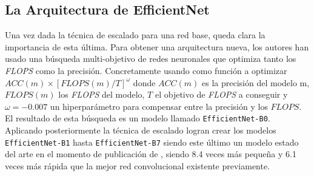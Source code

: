 \subsection{La Arquitectura de EfficientNet}
Una vez dada la técnica de escalado para una red base, queda clara la importancia de esta última. Para obtener una arquitectura nueva, los autores han usado una búsqueda multi-objetivo de redes neuronales que optimiza tanto los \textit{FLOPS} como la precisión. Concretamente usando como función a optimizar $ACC(m)\times [FLOPS(m)/T]^\omega$ donde $ACC(m)$ es la precisión del modelo m, $FLOPS(m)$ los \textit{FLOPS} del modelo, $T$ el objetivo de \textit{FLOPS} a conseguir y $\omega=-0.007$ un hiperparámetro para compensar entre la precisión y los $FLOPS$. El resultado de esta búsqueda es un modelo llamado \texttt{EfficientNet-B0}. Aplicando posteriormente la técnica de escalado logran crear los modelos \texttt{EfficientNet-B1} hasta \texttt{EfficientNet-B7} siendo este último un modelo estado del arte en el momento de publicación de \cite{efficientnet}, siendo 8.4 veces más pequeña y 6.1 veces más rápida que la mejor red convolucional existente previamente.